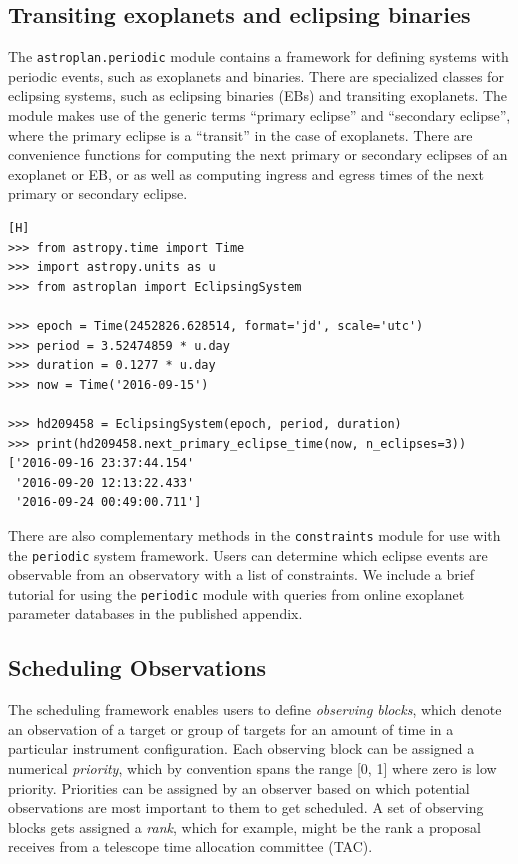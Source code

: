 \subsection{Transiting exoplanets and eclipsing binaries}

The \texttt{astroplan.periodic} module contains a framework for defining systems with periodic events, such as exoplanets and binaries. There are specialized classes for eclipsing systems, such as eclipsing binaries (EBs) and transiting exoplanets. The module makes use of the generic terms ``primary eclipse'' and ``secondary eclipse'', where the primary eclipse is a ``transit'' in the case of exoplanets. There are convenience functions for computing the next primary or secondary eclipses of an exoplanet or EB, or as well as computing ingress and egress times of the next primary or secondary eclipse.
\begin{lstlisting}[caption=Find upcoming exoplanet transit times][H]
>>> from astropy.time import Time
>>> import astropy.units as u
>>> from astroplan import EclipsingSystem

>>> epoch = Time(2452826.628514, format='jd', scale='utc')
>>> period = 3.52474859 * u.day
>>> duration = 0.1277 * u.day
>>> now = Time('2016-09-15')

>>> hd209458 = EclipsingSystem(epoch, period, duration)
>>> print(hd209458.next_primary_eclipse_time(now, n_eclipses=3))
['2016-09-16 23:37:44.154' 
 '2016-09-20 12:13:22.433' 
 '2016-09-24 00:49:00.711']
\end{lstlisting}

There are also complementary methods in the \texttt{constraints} module for use with the \texttt{periodic} system framework. Users can determine which eclipse events are observable from an observatory with a list of constraints. We include a brief tutorial for using the \texttt{periodic} module with queries from online exoplanet parameter databases in the published appendix.


\subsection{Scheduling Observations}

The scheduling framework enables users to define \textit{observing blocks}, which denote an observation of a target or group of targets for an amount of time in a particular instrument configuration. Each observing block can be assigned a numerical \textit{priority}, which by convention spans the range [0, 1] where zero is low priority. Priorities can be assigned by an observer based on which potential observations are most important to them to get scheduled. A set of observing blocks gets assigned a \textit{rank}, which for example, might be the rank a proposal receives from a telescope time allocation committee (TAC). 

